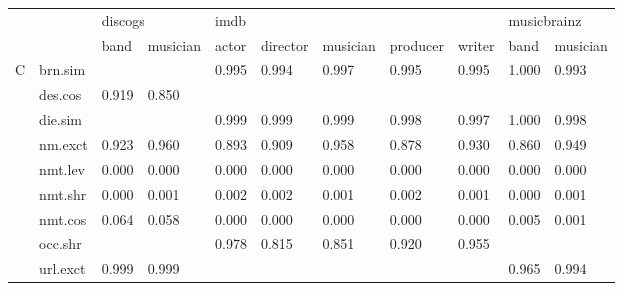 \documentclass[epsfig,a4paper,11pt,titlepage,twoside,openany]{book}
\begin{document}
\begin{table}[]
\centering
\begin{tabular}{ll|l|l|l|l|l|l|l|l|l|}
\cline{3-11}
                                                       &          & \multicolumn{2}{l|}{discogs} & \multicolumn{5}{l|}{imdb}                       & \multicolumn{2}{l|}{musicbrainz} \\ \cline{3-11} 
                                                       &          & band        & musician       & actor & director & musician & producer & writer & band          & musician         \\ \hline \hline
\multicolumn{1}{|l|}{\multirow{10}{*}{C}} & brn.sim  &             &                & 0.995 & 0.994    & 0.997    & 0.995    & 0.995  & 1.000         & 0.993            \\ \cline{2-11} 
\multicolumn{1}{|l|}{}                                 & des.cos  & 0.919       & 0.850          &       &          &          &          &        &               &                  \\ \cline{2-11} 
\multicolumn{1}{|l|}{}                                 & die.sim  &             &                & 0.999 & 0.999    & 0.999    & 0.998    & 0.997  & 1.000         & 0.998            \\ \cline{2-11} 
\multicolumn{1}{|l|}{}                                 & nm.exct  & 0.923       & 0.960          & 0.893 & 0.909    & 0.958    & 0.878    & 0.930  & 0.860         & 0.949            \\ \cline{2-11} 
\multicolumn{1}{|l|}{}                                 & nmt.lev  & 0.000       & 0.000          & 0.000 & 0.000    & 0.000    & 0.000    & 0.000  & 0.000         & 0.000            \\ \cline{2-11} 
\multicolumn{1}{|l|}{}                                 & nmt.shr  & 0.000       & 0.001          & 0.002 & 0.002    & 0.001    & 0.002    & 0.001  & 0.000         & 0.001            \\ \cline{2-11} 
\multicolumn{1}{|l|}{}                                 & nmt.cos  & 0.064       & 0.058          & 0.000 & 0.000    & 0.000    & 0.000    & 0.000  & 0.005         & 0.001            \\ \cline{2-11} 
\multicolumn{1}{|l|}{}                                 & occ.shr  &             &                & 0.978 & 0.815    & 0.851    & 0.920    & 0.955  &               &                  \\ \cline{2-11} 
\multicolumn{1}{|l|}{}                                 & url.exct & 0.999       & 0.999          &       &          &          &          &        & 0.965         & 0.994            \\ \cline{2-11} 

\end{tabular}
\end{table}
\end{document}
